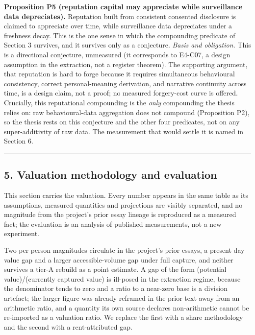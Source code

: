 \documentclass[
  11pt,
]{article}
\begin{document}
\textbf{Proposition P5 (reputation capital may appreciate while
surveillance data depreciates).} Reputation built from consistent
consented disclosure is claimed to appreciate over time, while
surveillance data depreciates under a freshness decay. This is the one
sense in which the compounding predicate of Section 3 survives, and it
survives only as a conjecture. \emph{Basis and obligation.} This is a
directional conjecture, unmeasured (it corresponds to E4-C07, a design
assumption in the extraction, not a register theorem). The supporting
argument, that reputation is hard to forge because it requires
simultaneous behavioural consistency, correct personal-meaning
derivation, and narrative continuity across time, is a design claim, not
a proof; no measured forgery-cost curve is offered. Crucially, this
reputational compounding is the \emph{only} compounding the thesis
relies on: raw behavioural-data aggregation does not compound
(Proposition P2), so the thesis rests on this conjecture and the other
four predicates, not on any super-additivity of raw data. The
measurement that would settle it is named in Section 6.

\begin{center}\rule{0.5\linewidth}{0.5pt}\end{center}

\subsection{5. Valuation methodology and
evaluation}\label{valuation-methodology-and-evaluation}

This section carries the valuation. Every number appears in the same
table as its assumptions, measured quantities and projections are
visibly separated, and no magnitude from the project's prior essay
lineage is reproduced as a measured fact; the evaluation is an analysis
of published measurements, not a new experiment.

Two per-person magnitudes circulate in the project's prior essays, a
present-day value gap and a larger accessible-volume gap under full
capture, and neither survives a tier-A rebuild as a point estimate. A
gap of the form (potential value)/(currently captured value) is
ill-posed in the extraction regime, because the denominator tends to
zero and a ratio to a near-zero base is a division artefact; the larger
figure was already reframed in the prior text away from an arithmetic
ratio, and a quantity its own source declares non-arithmetic cannot be
re-imported as a valuation ratio. We replace the first with a share
methodology and the second with a rent-attributed gap.
\end{document}
